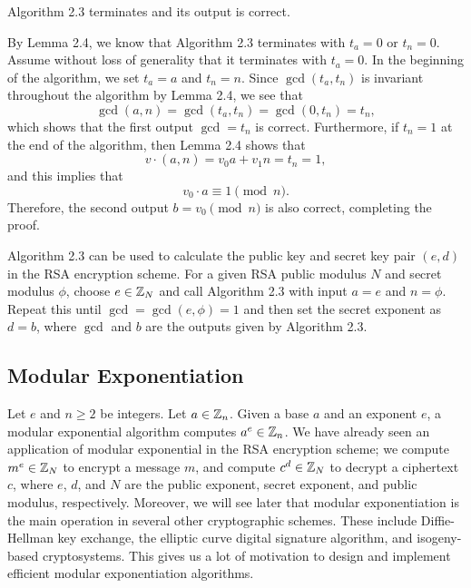 \begin{thm}
Algorithm 2.3 terminates and its output is correct.
\end{thm}
\begin{pf}
By Lemma 2.4, we know that Algorithm 2.3 terminates with $t_a = 0$ or $t_n = 0$. Assume without 
loss of generality that it terminates with $t_a = 0$. In the beginning of the algorithm,
we set $t_a = a$ and $t_n = n$. Since $\gcd(t_a, t_n)$ is invariant throughout the algorithm by 
Lemma 2.4, we see that 
\[ \gcd(a, n) = \gcd(t_a, t_n) = \gcd(0, t_n) = t_n, \]
which shows that the first output $\gcd = t_n$ is correct. Furthermore, if $t_n = 1$ at the 
end of the algorithm, then Lemma 2.4 shows that 
\[ v \cdot (a, n) = v_0a + v_1n = t_n = 1, \]
and this implies that
\[ v_0 \cdot a \equiv 1 \pmod n. \]
Therefore, the second output $b = v_0 \pmod n$ is also correct, completing the proof.
\end{pf}

Algorithm 2.3 can be used to calculate the public key and secret key pair $(e, d)$ in the RSA 
encryption scheme. For a given RSA public modulus $N$ and secret modulus $\phi$, choose 
$e \in \mathbb{Z}_N$ and call Algorithm 2.3 with input $a = e$ and $n = \phi$. Repeat this until 
$\gcd = \gcd(e, \phi) = 1$ and then set the secret exponent as $d = b$, where $\gcd$ and $b$ are the 
outputs given by Algorithm 2.3. 

\subsection{Modular Exponentiation}
Let $e$ and $n\geq 2$ be integers. Let $a \in \mathbb{Z}_n$. Given a base $a$ and an exponent $e$, 
a modular exponential algorithm computes $a^e \in \mathbb{Z}_n$. We have already seen an application of modular
exponential in the RSA encryption scheme; we compute $m^e \in \mathbb{Z}_N$ to encrypt a message $m$, 
and compute $c^d \in \mathbb{Z}_N$ to decrypt a ciphertext $c$, where $e$, $d$, and $N$ are the public 
exponent, secret exponent, and public modulus, respectively. Moreover, we will see later 
that modular exponentiation is the main operation in several other cryptographic schemes. 
These include Diffie-Hellman key exchange, the elliptic curve digital signature algorithm, 
and isogeny-based cryptosystems. This gives us a lot of motivation to design and implement 
efficient modular exponentiation algorithms. 

